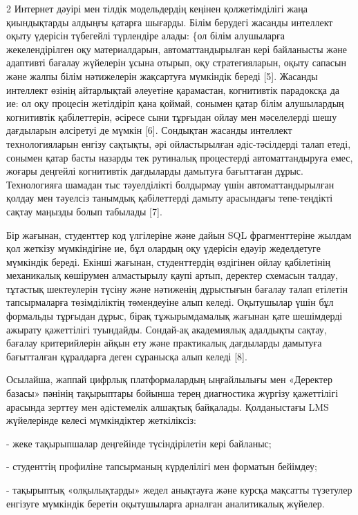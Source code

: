 \begin{multicols}{2}
Интернет дәуірі мен тілдік модельдердің кеңінен қолжетімділігі жаңа
қиындықтарды алдыңғы қатарға шығарды. Білім берудегі жасанды интеллект
оқыту үдерісін түбегейлі түрлендіре алады: \{ол білім алушыларға
жекелендірілген оқу материалдарын, автоматтандырылған кері байланысты
және адаптивті бағалау жүйелерін ұсына отырып, оқу стратегияларын, оқыту
сапасын және жалпы білім нәтижелерін жақсартуға мүмкіндік береді
{[}5{]}. Жасанды интеллект өзінің айтарлықтай әлеуетіне қарамастан,
когнитивтік парадоксқа да ие: ол оқу процесін жетілдіріп қана қоймай,
сонымен қатар білім алушылардың когнитивтік қабілеттерін, әсіресе сыни
тұрғыдан ойлау мен мәселелерді шешу дағдыларын әлсіретуі де мүмкін
{[}6{]}. Сондықтан жасанды интеллект технологияларын енгізу сақтықты,
әрі ойластырылған әдіс-тәсілдерді талап етеді, сонымен қатар басты
назарды тек рутиналық процестерді автоматтандыруға емес, жоғары деңгейлі
когнитивтік дағдыларды дамытуға бағыттаған дұрыс. Технологияға шамадан
тыс тәуелділікті болдырмау үшін автоматтандырылған қолдау мен тәуелсіз
танымдық қабілеттерді дамыту арасындағы тепе-теңдікті сақтау маңызды
болып табылады {[}7{]}.

Бір жағынан, студенттер код үлгілеріне және дайын SQL фрагменттеріне
жылдам қол жеткізу мүмкіндігіне ие, бұл олардың оқу үдерісін едәуір
жеделдетуге мүмкіндік береді. Екінші жағынан, студенттердің өздігінен
ойлау қабілетінің механикалық көшірумен алмастырылу қаупі артып,
деректер схемасын талдау, тұтастық шектеулерін түсіну және нәтиженің
дұрыстығын бағалау талап етілетін тапсырмаларға төзімділіктің
төмендеуіне алып келеді. Оқытушылар үшін бұл формальды тұрғыдан дұрыс,
бірақ тұжырымдамалық жағынан қате шешімдерді ажырату қажеттілігі
туындайды. Сондай-ақ академиялық адалдықты сақтау, бағалау критерийлерін
айқын ету және практикалық дағдыларды дамытуға бағытталған құралдарға
деген сұранысқа алып келеді {[}8{]}.

Осылайша, жаппай цифрлық платформалардың ыңғайлылығы мен «Деректер
базасы» пәнінің тақырыптары бойынша терең диагностика жүргізу
қажеттілігі арасында зерттеу мен әдістемелік алшақтық байқалады.
Қолданыстағы LMS жүйелерінде келесі мүмкіндіктер жеткіліксіз:

- жеке тақырыпшалар деңгейінде түсіндірілетін кері байланыс;

- студенттің профиліне тапсырманың күрделілігі мен форматын бейімдеу;

- тақырыптық «олқылықтарды» жедел анықтауға және курсқа мақсатты
түзетулер енгізуге мүмкіндік беретін оқытушыларға арналған аналитикалық
жүйелер.


\end{multicols}
